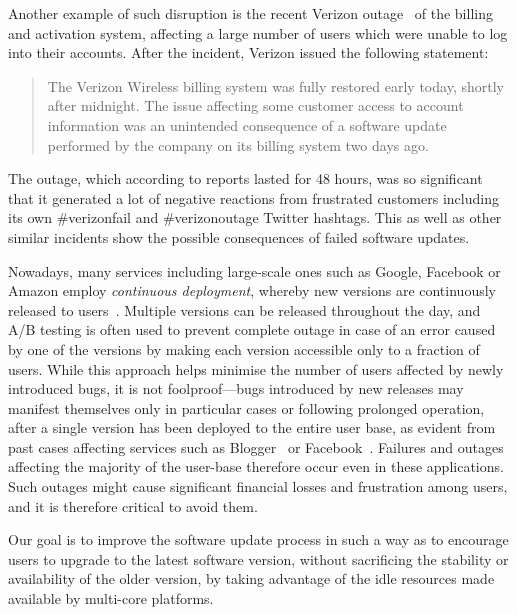 Another example of such disruption is the recent Verizon
outage~\cite{verizon-outage2014} of the billing and activation system,
affecting a large number of users which were unable to log into their accounts.
After the incident, Verizon issued the following statement:
\begin{quotation}
The Verizon Wireless billing system was fully restored early today, shortly
after midnight. The issue affecting some customer access to account information
was an unintended consequence of a software update performed by the company on
its billing system two days ago.
\end{quotation}
The outage, which according to reports lasted for 48 hours, was so significant 
that it generated a lot of negative reactions from frustrated customers
including its own \textsf{\#verizonfail} and \textsf{\#verizonoutage} Twitter
hashtags. This as well as other similar incidents show the possible
consequences of failed software updates.


Nowadays, many services including large-scale ones such as Google, Facebook or
Amazon employ \emph{continuous deployment}, whereby new versions are
continuously released to users~\cite{johnson2009}. Multiple versions can be
released throughout the day, and A/B testing is often used to
prevent complete outage in case of an error caused by one of the versions by
making each version accessible only to a fraction of users. While this
approach helps minimise the number of users affected by newly introduced bugs,
it is not foolproof---bugs introduced by new releases may manifest themselves
only in particular cases or following prolonged operation, after a single
version has been deployed to the entire user base, as evident from past cases
affecting services such as Blogger~\cite{blogger-incident2011} or
Facebook~\cite{facebook-incident2010}. Failures and outages affecting the
majority of the user-base therefore occur even in these applications. Such
outages might cause significant financial losses and frustration among users,
and it is therefore critical to avoid them.

Our goal is to improve the software update process in such a way as to
encourage users to upgrade to the latest software version, without sacrificing
the stability or availability of the older version, by taking advantage of the
idle resources made available by multi-core platforms.

